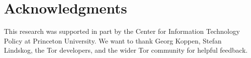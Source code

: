 \section*{Acknowledgments}
This research was supported in part by the Center for Information Technology
Policy at Princeton University.  We want to thank Georg Koppen, Stefan Lindskog,
the Tor developers, and the wider Tor community for helpful feedback.
